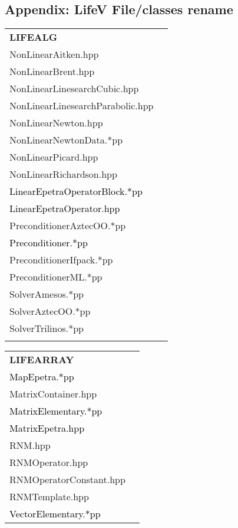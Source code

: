 \documentclass[10p]{article}
\newcommand{\newparts}[1]{\textcolor{black}{#1}}
\theoremstyle{definition}
\begin{document}
\begin{landscape}
\section*{Appendix: LifeV File/classes rename}
\begin{table}[!h]
\fontsize{7}{7}\selectfont
\begin{multicols}{4}
\begin{xtabular}{
p{0.20\textwidth}<{}
p{0.10\textwidth}<{}
}
\textbf{LIFEALG} \\
NonLinearAitken.hpp & \\
NonLinearBrent.hpp & \\
NonLinearLinesearchCubic.hpp & \\
NonLinearLinesearchParabolic.hpp & \\
NonLinearNewton.hpp & \\
NonLinearNewtonData.*pp & \\
NonLinearPicard.hpp & \\
NonLinearRichardson.hpp & \\
\newparts{LinearEpetraOperatorBlock.*pp} & \\
\newparts{LinearEpetraOperator.hpp} & \\
PreconditionerAztecOO.*pp & \\
\newparts{Preconditioner.*pp} & \\
PreconditionerIfpack.*pp & \\
PreconditionerML.*pp & \\
SolverAmesos.*pp & \\
SolverAztecOO.*pp & \\
SolverTrilinos.*pp & \\
& \\
\end{xtabular}
\begin{xtabular}{
p{0.20\textwidth}<{}
p{0.10\textwidth}<{}
}
\textbf{LIFEARRAY} \\
\newparts{MapEpetra.*pp} & \\
MatrixContainer.hpp &\\
\newparts{MatrixElementary.*pp} & \\
\newparts{MatrixEpetra.hpp} & \\
RNM.hpp &\\
RNMOperator.hpp &\\
RNMOperatorConstant.hpp &\\
RNMTemplate.hpp &\\
\newparts{VectorElementary.*pp} & \\

\end{xtabular}
\end{multicols}
\end{table}
\end{landscape}
\end{document}
